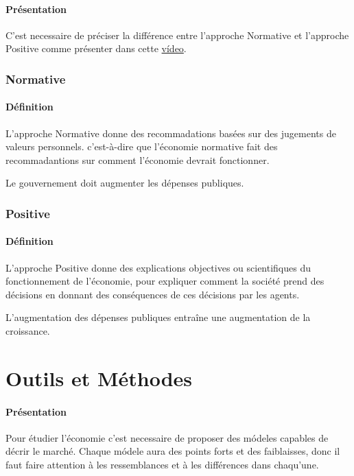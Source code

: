 \documentclass{article}
\begin{document}
\paragraph{Présentation}C'est necessaire de préciser la différence entre l'approche Normative et l'approche Positive comme présenter dans cette \href{https://www.youtube.com/watch?v=X5i4tLiih5E}{vídeo}.

\subsubsection{Normative}
\paragraph{Définition}L'approche Normative donne des recommadations basées sur des jugements de valeurs personnels. c'est-à-dire que l'économie normative fait des recommadantions sur comment l'économie devrait fonctionner.
\begin{example}
    Le gouvernement doit augmenter les dépenses publiques.
\end{example}

\subsubsection{Positive}
\paragraph{Définition}L'approche Positive donne des explications objectives ou scientifiques du fonctionnement de l'économie, pour expliquer comment la société prend des décisions en donnant des conséquences de ces décisions par les agents.
\begin{example}
    L'augmentation des dépenses publiques entraîne une augmentation de la croissance.
\end{example}


\section{Outils et Méthodes}
\paragraph{Présentation}Pour étudier l'économie c'est necessaire de proposer des módeles capables de décrir le marché. Chaque módele aura des points forts et des faiblaisses, donc il faut faire attention à les ressemblances et à les différences dans chaqu'une.
\end{document}
